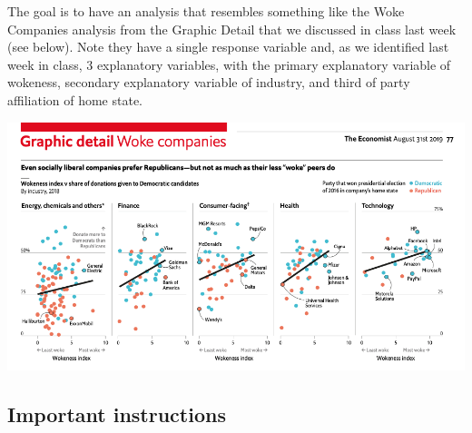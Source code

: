 \documentclass{article}\usepackage[]{graphicx}\usepackage[]{color}
\begin{document}
The goal is to have an analysis that resembles something like the Woke Companies analysis from the Graphic Detail that we discussed in class last week  (see below). Note they have a single response variable and, as we identified last week in class, 3 explanatory variables, with the primary explanatory variable of wokeness, secondary explanatory variable of industry, and third of party affiliation of home state.

\begin{center}
\includegraphics[width=.6\textwidth]{woke-inc.png}
\end{center}


\subsection*{Important instructions}
\end{document}
